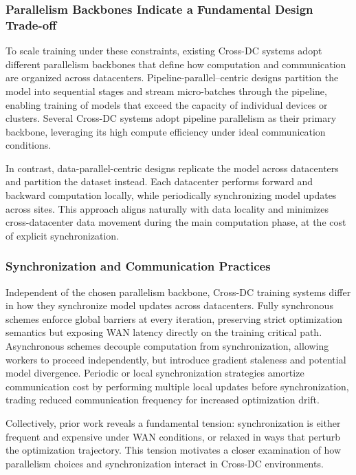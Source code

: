 \subsubsection{Parallelism Backbones Indicate a Fundamental Design Trade-off}

To scale training under these constraints, existing Cross-DC systems adopt different parallelism backbones that define how computation and communication are organized across datacenters. Pipeline-parallel–centric designs partition the model into sequential stages and stream micro-batches through the pipeline, enabling training of models that exceed the capacity of individual devices or clusters. Several Cross-DC systems\cite{DBLP:conf/usenix/ChenKHH25, DBLP:journals/corr/abs-2510-12064, DBLP:conf/hotnets/DengS00025} adopt pipeline parallelism as their primary backbone, leveraging its high compute efficiency under ideal communication conditions.

In contrast, data-parallel-centric designs replicate the model across datacenters and partition the dataset instead. Each datacenter performs forward and backward computation locally, while periodically synchronizing model updates across sites. This approach aligns naturally with data locality and minimizes cross-datacenter data movement during the main computation phase, at the cost of explicit synchronization.

\subsubsection{Synchronization and Communication Practices}

Independent of the chosen parallelism backbone, Cross-DC training systems differ in how they synchronize model updates across datacenters. Fully synchronous schemes enforce global barriers at every iteration, preserving strict optimization semantics but exposing WAN latency directly on the training critical path. Asynchronous schemes decouple computation from synchronization, allowing workers to proceed independently, but introduce gradient staleness and potential model divergence. Periodic or local synchronization strategies amortize communication cost by performing multiple local updates before synchronization, trading reduced communication frequency for increased optimization drift.

Collectively, prior work reveals a fundamental tension: synchronization is either frequent and expensive under WAN conditions, or relaxed in ways that perturb the optimization trajectory. This tension motivates a closer examination of how parallelism choices and synchronization interact in Cross-DC environments.

